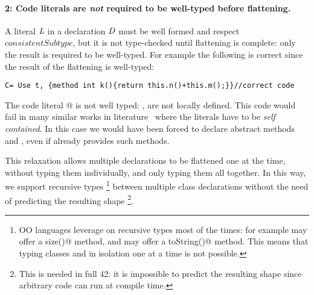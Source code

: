 \paragraph{2: Code literals are \emph{not} required to be well-typed before flattening.}
A literal $\mathit{L}$ in a declaration $\mathit{D}$
must be well formed and respect
$\mathit{consistentSubtype}$, but
it is not type-checked until flattening is complete:
only the result is required to be well-typed.
For example the following is correct since
the result of the flattening is well-typed:
\begin{lstlisting}
C= Use t, {method int k(){return this.n()+this.m();}}//correct code
\end{lstlisting}
The code literal
@
is not well typed: \Q@n@, \Q@m@ are not locally defined.
This code would fail in many similar works in literature~\cite{deep,Bettini2015282,Bergel2007} where the
literals have to be \emph{self contained}. In this case we would have been forced to
declare abstract methods \Q@n@ and \Q@m@, even if \Q@t@ already 
provides such methods.

This relaxation allows multiple declarations to be flattened one at the time, without typing them individually, and only typing them all together.
In this way, we support recursive types%
\footnote{
OO languages leverage on recursive types most of the times:
for example \Q@String@ may offer a \Q@Int size()@
method, and \Q@Int@ may offer a \Q@String toString()@ method.
This means that typing classes 
\Q@String@ and \Q@Int@ in isolation one at a time is not possible.}
between multiple class declarations without
the need of predicting the resulting shape%
\footnote{This is needed in full 42: it is
impossible to predict the resulting shape since
arbitrary code can run at compile time.}.

